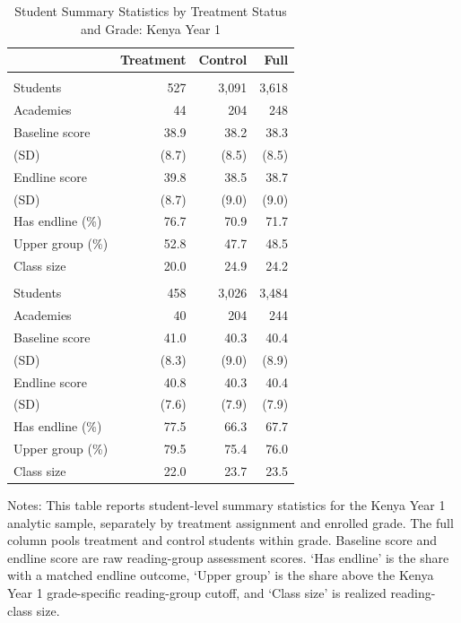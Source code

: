 \begin{table}[htbp]
\caption{Student Summary Statistics by Treatment Status and Grade: Kenya Year 1}
\label{tab:ke_sumstats}
\begin{center}
\begin{small}
\begin{threeparttable}
\renewcommand{\arraystretch}{0.95}
\begin{tabular}{l*{3}{r}}
\toprule
 & Treatment & Control & Full \\
\midrule
\addlinespace
\multicolumn{4}{l}{\textit{Grade 1}} \\
Students & 527 & 3,091 & 3,618 \\
Academies & 44 & 204 & 248 \\
Baseline score & 38.9 & 38.2 & 38.3 \\
\quad (SD) & (8.7) & (8.5) & (8.5) \\
Endline score & 39.8 & 38.5 & 38.7 \\
\quad (SD) & (8.7) & (9.0) & (9.0) \\
Has endline (\%) & 76.7 & 70.9 & 71.7 \\
Upper group (\%) & 52.8 & 47.7 & 48.5 \\
Class size & 20.0 & 24.9 & 24.2 \\
\addlinespace
\multicolumn{4}{l}{\textit{Grade 2}} \\
Students & 458 & 3,026 & 3,484 \\
Academies & 40 & 204 & 244 \\
Baseline score & 41.0 & 40.3 & 40.4 \\
\quad (SD) & (8.3) & (9.0) & (8.9) \\
Endline score & 40.8 & 40.3 & 40.4 \\
\quad (SD) & (7.6) & (7.9) & (7.9) \\
Has endline (\%) & 77.5 & 66.3 & 67.7 \\
Upper group (\%) & 79.5 & 75.4 & 76.0 \\
Class size & 22.0 & 23.7 & 23.5 \\
\bottomrule
\end{tabular}
\renewcommand{\arraystretch}{1}
\begin{tablenotes}
\footnotesize \item Notes: This table reports student-level summary statistics for the Kenya Year 1 analytic sample, separately by treatment assignment and enrolled grade. The full column pools treatment and control students within grade. Baseline score and endline score are raw reading-group assessment scores. `Has endline' is the share with a matched endline outcome, `Upper group' is the share above the Kenya Year 1 grade-specific reading-group cutoff, and `Class size' is realized reading-class size.
\end{tablenotes}
\end{threeparttable}
\end{small}
\end{center}
\end{table}